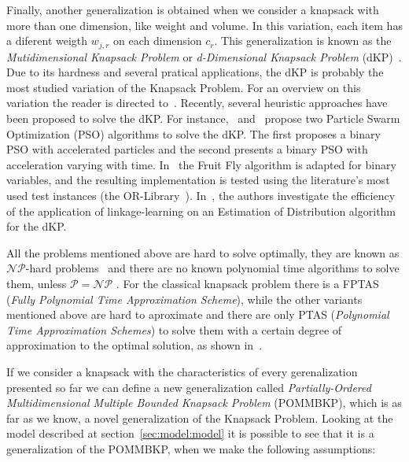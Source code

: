 Finally, another generalization is obtained when we consider a knapsack with more than one dimension, like weight and volume. In this variation, 
each item has a diferent weigth $w_{j,r}$ on each dimension $c_r$. This generalization is known as the \textit{Mutidimensional Knapsack Problem} 
or \textit{d-Dimensional Knapsack Problem} (dKP)~\cite{kellerer2004knapsack}. Due to its hardness and several pratical applications, the dKP is probably 
the most studied variation of the Knapsack Problem. For an overview on this variation the reader is directed to~\cite{freville2004}. 
Recently, several heuristic approaches have been proposed to solve the dKP. For instance,~\cite{beheshti2013} and~\cite{chih2014} propose two Particle
Swarm Optimization (PSO) algorithms to solve the dKP. The first proposes a binary PSO with accelerated particles and the second presents a binary PSO 
with acceleration varying with time. In~\cite{wang2013} the Fruit Fly algorithm is adapted for binary variables, and the resulting implementation is 
tested using the literature's most used test instances (the OR-Library~\cite{chubeasley1998}). In~\cite{martins2014}, the authors investigate the efficiency
of the application of linkage-learning on an Estimation of Distribution algorithm for the dKP.

All the problems mentioned above are hard to solve optimally, they are known as $\mathcal{NP}$-hard problems~\cite{kellerer2004knapsack} and there 
are no known polynomial time algorithms to solve them, unless $\mathcal{P} = \mathcal{NP}$ \cite{garey1978}.
For the classical knapsack problem there is a FPTAS (\textit{Fully Polynomial Time Approximation Scheme}),
while the other variants mentioned above are hard to aproximate and there are only PTAS (\textit{Polynomial Time Approximation Schemes}) 
to solve them with a certain degree of approximation to the optimal solution, as shown in~\cite{pok2002, puchinger2006core, dawande2000approximation}. 

If we consider a knapsack with the characteristics of every gerenalization presented so far we can define a new generalization
called \textit{Partially-Ordered Multidimensional Multiple Bounded Knapsack Problem} (POMMBKP), which is as far as we know, a novel generalization of the
Knapsack Problem. Looking at the model described at section~\ref{sec:model:model} it is possible to see that it is a generalization of the POMMBKP, 
when we make the following assumptions:

